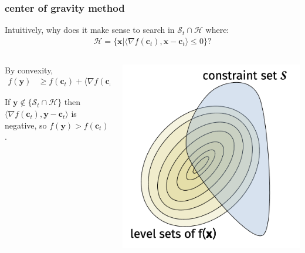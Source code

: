 \documentclass[compress]{beamer}
\newcommand{\bv}[1]{\mathbf{#1}}
\begin{document}
\begin{frame}[t]
	\frametitle{center of gravity method}
	Intuitively, why does it make sense to search in $\mathcal{S}_t \cap \mathcal{H}$ where:
	\begin{align*}
		\mathcal{H} = \{\bv{x} \big\vert \langle \nabla f(\bv{c}_t), \bv{x}-\bv{c}_t\rangle \leq 0\}?
	\end{align*}
	
	\begin{columns}
		\begin{column}{.45\textwidth}
			By convexity, 
			\begin{align*}
				f(\bv{y}) &\geq f(\bv{c}_t) +  \langle\nabla f(\bv{c}_t), \bv{y}-\bv{c}_t\rangle.
			\end{align*}

			If $\bv{y} \notin \{\mathcal{S}_t \cap \mathcal{H}\}$ then $\langle\nabla f(\bv{c}_t), \bv{y}-\bv{c}_t\rangle$ is negative, so $f(\bv{y}) > f(\bv{c}_t)$. 
		\end{column}
		\begin{column}{.55\textwidth}
			\includegraphics[width=\textwidth]{level_sets_constrained.png}
		\end{column}
	\end{columns}
	
\end{frame}
\end{document}
